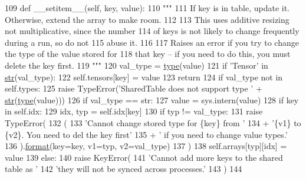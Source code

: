 \begin{DoxyCode}
109     \textcolor{keyword}{def }\_\_setitem\_\_(self, key, value):
110         \textcolor{stringliteral}{"""}
111 \textcolor{stringliteral}{        If key is in table, update it. Otherwise, extend the array to make room.}
112 \textcolor{stringliteral}{}
113 \textcolor{stringliteral}{        This uses additive resizing not multiplicative, since the number}
114 \textcolor{stringliteral}{        of keys is not likely to change frequently during a run, so do not}
115 \textcolor{stringliteral}{        abuse it.}
116 \textcolor{stringliteral}{}
117 \textcolor{stringliteral}{        Raises an error if you try to change the type of the value stored for}
118 \textcolor{stringliteral}{        that key -- if you need to do this, you must delete the key first.}
119 \textcolor{stringliteral}{        """}
120         val\_type = \hyperlink{namespaceparlai_1_1agents_1_1tfidf__retriever_1_1build__tfidf_ad5dfae268e23f506da084a9efb72f619}{type}(value)
121         \textcolor{keywordflow}{if} \textcolor{stringliteral}{'Tensor'} \textcolor{keywordflow}{in} \hyperlink{namespacegenerate__task__READMEs_a5b88452ffb87b78c8c85ececebafc09f}{str}(val\_type):
122             self.tensors[key] = value
123             \textcolor{keywordflow}{return}
124         \textcolor{keywordflow}{if} val\_type \textcolor{keywordflow}{not} \textcolor{keywordflow}{in} self.types:
125             \textcolor{keywordflow}{raise} TypeError(\textcolor{stringliteral}{'SharedTable does not support type '} + \hyperlink{namespacegenerate__task__READMEs_a5b88452ffb87b78c8c85ececebafc09f}{str}(\hyperlink{namespaceparlai_1_1agents_1_1tfidf__retriever_1_1build__tfidf_ad5dfae268e23f506da084a9efb72f619}{type}(value)))
126         \textcolor{keywordflow}{if} val\_type == str:
127             value = sys.intern(value)
128         \textcolor{keywordflow}{if} key \textcolor{keywordflow}{in} self.idx:
129             idx, typ = self.idx[key]
130             \textcolor{keywordflow}{if} typ != val\_type:
131                 \textcolor{keywordflow}{raise} TypeError(
132                     (
133                         \textcolor{stringliteral}{'Cannot change stored type for \{key\} from '}
134                         + \textcolor{stringliteral}{'\{v1\} to \{v2\}. You need to del the key first'}
135                         + \textcolor{stringliteral}{' if you need to change value types.'}
136                     ).\hyperlink{namespaceparlai_1_1chat__service_1_1services_1_1messenger_1_1shared__utils_a32e2e2022b824fbaf80c747160b52a76}{format}(key=key, v1=typ, v2=val\_type)
137                 )
138             self.arrays[typ][idx] = value
139         \textcolor{keywordflow}{else}:
140             \textcolor{keywordflow}{raise} KeyError(
141                 \textcolor{stringliteral}{'Cannot add more keys to the shared table as '}
142                 \textcolor{stringliteral}{'they will not be synced across processes.'}
143             )
144 
\end{DoxyCode}
